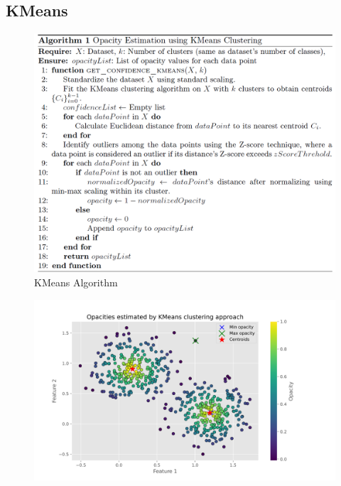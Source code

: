 \documentclass[aspectratio=169]{beamer}
\begin{document}
\subsection{{\rm KMeans}}
\begin{frame}
\begin{figure}
    \centering
    \includegraphics[width=0.68\linewidth]{../../fig/alg_kmeans_opacity.png}
    \caption{KMeans Algorithm}
    \label{fig:alg_kmeans}
\end{figure}
\end{frame}

\begin{frame}
\begin{figure}
    \centering
    \includegraphics[width=0.78\linewidth]{../../fig/kmeans_opactiy.png}
    \label{fig:kmeans_opacity}
\end{figure}
\end{frame}
\end{document}

